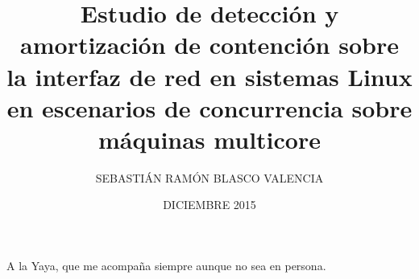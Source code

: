 \documentclass[upright, contnum]{umemoria}
\author{SEBASTIÁN RAMÓN BLASCO VALENCIA}
\title{Estudio de detección y amortización de contención sobre la interfaz de red en sistemas Linux en escenarios de concurrencia sobre máquinas multicore}
\date{DICIEMBRE 2015}
\begin{document}
\frontmatter
\maketitle



\begin{dedicatoria} %
A la Yaya, que me acompaña siempre aunque no sea en persona.
\end{dedicatoria}


\cleardoublepage

\tableofcontents
\listoftables %
\listoffigures %

\mainmatter

%

%
%

%



%

%







\end{document}
